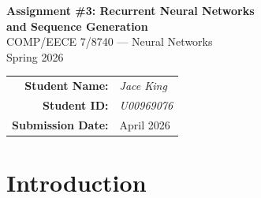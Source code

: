 \documentclass[11pt,letterpaper]{article}
\begin{document}
\begin{titlepage}
  \centering
  \vspace*{2cm}
  {\LARGE\bfseries Assignment \#3: Recurrent Neural Networks\\[0.4em]
   and Sequence Generation}\\[1.2cm]
  {\large COMP/EECE 7/8740 --- Neural Networks}\\[0.4cm]
  {\large Spring 2026}\\[2.5cm]
  \begin{tabular}{rl}
    \textbf{Student Name:}   & \textit{Jace King}\\[0.5cm]
    \textbf{Student ID:}     & \textit{U00969076}\\[0.5cm]
    \textbf{Submission Date:}& April 2026\\
  \end{tabular}
  \vfill
\end{titlepage}

\begin{abstract}
This report investigates recurrent and attention-based neural architectures for two
sequence modelling tasks.
\textbf{Task~1} applies SimpleRNN, LSTM, and GRU models to predict Google stock
prices, evaluated with RMSE and MAE on a held-out test set.
GRU achieves the lowest error (RMSE\,=\,8.93, MAE\,=\,6.72), followed by LSTM
(RMSE\,=\,10.99) and SimpleRNN (RMSE\,=\,12.05).
\textbf{Task~2} trains LSTM, GRU, and Transformer models for hotel description
generation using a next-word prediction formulation on the Seattle Hotels dataset.
All models are implemented in PyTorch, trained with the Adam optimiser and
categorical cross-entropy loss, and compared on training convergence and
qualitative text output.
Results demonstrate that gated architectures consistently outperform vanilla RNNs
for both regression and generation tasks, and that the Transformer model produces
competitive descriptions with faster convergence.
\end{abstract}

\newpage
\tableofcontents
\newpage

\section{Introduction}
\end{document}

